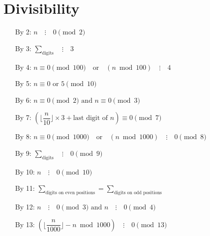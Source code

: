 \documentclass{article}
\begin{document}
\section{Divisibility}
\begin{itemize}
	\item[By 2:] $n \quad \vdots \quad 0 \pmod{2}$
	\item[By 3:] $\sum_{\text{digits}} \quad \vdots \quad 3$
	\item[By 4:] $n \equiv 0 \pmod{100} \quad \text{or} \quad (n \bmod{100})
		\quad\vdots\quad 4$
	\item[By 5:] $n \equiv 0 \text{ or } 5 \pmod{10}$
	\item[By 6:] $n \equiv 0 \pmod{2} \text{ and } n \equiv 0 \pmod{3}$
	\item[By 7:] $\left(\lfloor\dfrac{n}{10}\rfloor \times 3 +
		\text{last digit of } n\right) \equiv 0 \pmod{7}$
	\item[By 8:] $n \equiv 0 \pmod{1000} \quad \text{or} \quad
		(n \bmod 1000) \quad \vdots \quad 0 \pmod{8}$
	\item[By 9:] $\sum_{\text{digits}} \quad \vdots \quad 0 \pmod{9}$
	\item[By 10:] $n \quad \vdots \quad 0 \pmod{10}$
	\item[By 11:] $\sum_{\text{digits on even positions}} = 
		\sum_{\text{digits on odd positions}}$
	\item[By 12:] $n \quad \vdots \quad 0 \pmod{3} \text{ and }
		n \quad \vdots \quad 0 \pmod{4}$
	\item[By 13:] $\left(\lfloor\dfrac{n}{1000}\rfloor - n \bmod{1000}\right) \quad \vdots \quad 0 \pmod{13}$
\end{itemize}
\end{document}
